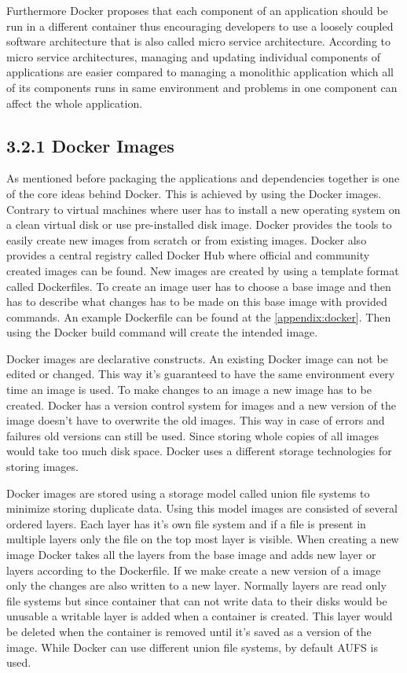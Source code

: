 \documentclass[12pt,oneandhalf,chaparabic,ceng,ms,eng,oneside,pntc]{gsufbe}
\begin{document}
Furthermore Docker proposes that each component of an application should be run in a 
different container thus encouraging developers to use a loosely coupled software architecture that is 
also called micro service architecture.  According to micro service architectures, managing and updating
individual components of applications are easier compared to managing a monolithic application which
all of its components runs in same environment and problems in one component can affect the whole
application.

\subsection[Docker Images]{3.2.1 Docker Images}
As mentioned before packaging the applications and dependencies together is one of the core ideas
behind Docker.  This is achieved by using the Docker images.  Contrary to virtual machines where user
has to install a new operating system on a clean virtual disk or use pre-installed disk image.  Docker 
provides the tools to easily create new images from scratch or from existing images.  Docker also
provides a central registry called Docker Hub where official and community created images can be found.
New images are created by using a template format called Dockerfiles.  To create an image user has to
choose a base image and then has to describe what changes has to be made on this base image with
provided commands.  An example Dockerfile can be found at the \ref{appendix:docker}.  Then using the
Docker build command will create the intended image.

Docker images are declarative constructs.  An existing Docker image can not be edited or changed.  This
way it's guaranteed to have the same environment every time an image is used.  To make changes to an
image a new image has to be created.  Docker has a version control system for images and a new version
of the image doesn't have to overwrite the old images.  This way in case of errors and failures old
versions can still be used.  Since storing whole copies of all images would take too much disk space.
Docker uses a different storage technologies for storing images.

Docker images are stored using a storage model called union file systems to minimize storing duplicate
data.  Using this model images are consisted of several ordered layers.  Each layer has it's own file
system and if a file is present in multiple layers only the file on the top most layer is visible.  When
creating a new image Docker takes all the layers from the base image and adds new layer or layers
according to the Dockerfile.  If we make create a new version of a image only the changes are also 
written to a new layer.  Normally layers are read only file systems but since container that can not
write data to their disks would be unusable a writable layer is added when a container is created.  This
layer would be deleted when the container is removed until it's saved as a version of the image.
While Docker can use different union file systems, by default AUFS is used.
\end{document}
